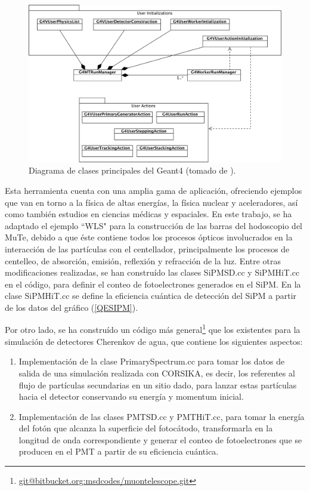 \documentclass[12pt,oneside,openany,letter]{book}
\begin{document}
\begin{figure}[h]
\centering
\includegraphics[scale=1.4]{images/geant4.jpg}
\caption[Diagrama de clases principales del Geant4]{Diagrama de clases principales del Geant4 (tomado de \cite{ALLISON2016186}).
\label{geant4} }
\end{figure}

Esta herramienta cuenta con una amplia gama de aplicaci\'on, ofreciendo ejemplos que van en torno a la f\'isica de altas energías, la física nuclear y aceleradores, así como también estudios en ciencias médicas y espaciales. En este trabajo, se ha adaptado el ejemplo ``WLS" para la construcci\'on de las barras del hodoscopio del MuTe, debido a que \'este contiene todos los procesos \'opticos involucrados en la interacci\'on de las part\'iculas con el centellador, principalmente los procesos de centelleo, de absorci\'on, emisi\'on, reflexi\'on y refracci\'on de la luz. Entre otras modificaciones realizadas, se han constru\'ido las clases SiPMSD.cc y SiPMHiT.cc en el c\'odigo, para definir el conteo de fotoelectrones generados en el SiPM. En la clase SiPMHiT.cc se define la eficiencia cu\'antica de detecci\'on del SiPM a partir de los datos del gr\'afico (\ref{QESIPM}).     

Por otro lado, se ha constru\'ido un c\'odigo m\'as general\footnote{\url{git@bitbucket.org:msdcodes/muontelescope.git}} que los existentes para la simulaci\'on de detectores Cherenkov de agua, que contiene los siguientes aspectos:

\begin{enumerate}
\item Implementaci\'on de la clase PrimarySpectrum.cc para tomar los datos de salida de una simulaci\'on realizada con CORSIKA, es decir, los referentes al flujo de part\'iculas secundarias en un sitio dado, para lanzar estas part\'iculas hacia el detector conservando su energ\'ia y momentum inicial.

\item Implementaci\'on de las clases PMTSD.cc y PMTHiT.cc, para tomar la energ\'ia del fot\'on que alcanza la superficie del fotoc\'atodo, transformarla en la longitud de onda correspondiente y generar el conteo de fotoelectrones que se producen en el PMT a partir de su eficiencia cu\'antica.


\end{enumerate}



\end{document}
